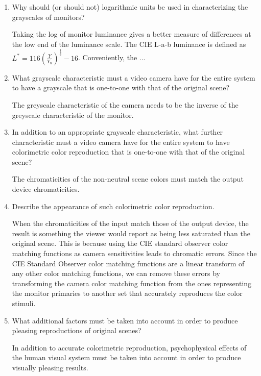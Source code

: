 \begin{enumerate}
\item Why should (or should not) logarithmic units be used in
characterizing the grayscales of monitors?

\par Taking the log of monitor luminance gives a better measure of differences at the low end of the luminance scale.
The CIE L-a-b luminance is defined as  $L^{*}=116
(\frac{Y}{Y_n})^{\frac{1}{3}} -16 $.  Conveniently, the ...


\item What grayscale characteristic must a video camera have for
the entire system to have a grayscale that is one-to-one with that
of the original scene?

\par The greyscale characteristic of the camera needs to be the inverse
of the greyscale characteristic of the monitor.

\item  In addition to an appropriate grayscale characteristic,
what further characteristic must a video camera have for the
entire system to have colorimetric color reproduction that is
one-to-one with that of the original scene?
\newline
\par The chromaticities of the non-neutral scene colors must match
the output device chromaticities.
\newline
\item Describe the appearance of such colorimetric color
reproduction.
\newline
\par When the chromaticities of the input match those of the output
device, the result is something the viewer would report as being
less saturated than the original scene. This is because using the
CIE standard observer color matching functions as camera
sensitivities leads to chromatic errors. Since the CIE Standard
Observer color matching functions are a linear transform of any
other color matching functions, we can remove these errors by
transforming the camera color matching function from the ones
representing the monitor primaries to another set that accurately
reproduces the color stimuli.
\newline

 \item  What additional factors must be taken into
account in order to produce pleasing reproductions of original
scenes?
\newline
\par In addition to accurate colorimetric reproduction,
psychophysical effects of the human visual system must be taken
into account in order to produce visually pleasing results.
\newline


\end{enumerate}
